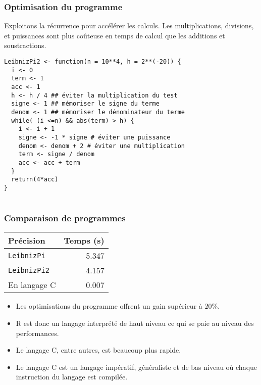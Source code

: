 \documentclass[10pt]{beamer}
\begin{document}
\begin{frame}[fragile]
  \frametitle{Optimisation du programme}
  \begin{alertblock}{Exploitons la récurrence pour accélérer les calculs.}
    \alert{Les multiplications, divisions, et puissances sont plus coûteuse en temps de calcul que les additions et soustractions.}
  \end{alertblock}

  \begin{lstlisting}
LeibnizPi2 <- function(n = 10**4, h = 2**(-20)) {
  i <- 0
  term <- 1
  acc <- 1
  h <- h / 4 ## éviter la multiplication du test
  signe <- 1 ## mémoriser le signe du terme 
  denom <- 1 ## mémoriser le dénominateur du terme
  while( (i <=n) && abs(term) > h) {
    i <- i + 1
    signe <- -1 * signe # éviter une puissance
    denom <- denom + 2 # éviter une multiplication
    term <- signe / denom
    acc <- acc + term
  }
  return(4*acc)
}
    
  \end{lstlisting}
\end{frame}

\begin{frame}
  \frametitle{Comparaison de programmes}

  
    \begin{table}[h]
    \centering
    \begin{tabular}{lr}
      \toprule
      Précision           & Temps (s) \\
      \midrule
      \texttt{LeibnizPi}  & 5.347     \\
      \texttt{LeibnizPi2} & 4.157     \\
      En langage C        & 0.007     \\
             \bottomrule
    \end{tabular}
  \end{table}

  \begin{itemize}
  \item Les optimisations du programme offrent un gain supérieur à $20\%$.
  \item R est donc un langage interprété de haut niveau ce qui se paie au niveau des performances.
  \item Le langage C, entre autres, est beaucoup plus rapide.
  \item Le langage C est un langage impératif, généraliste et de bas niveau où chaque instruction du langage est compilée.
  \end{itemize}

\end{frame}
\end{document}
